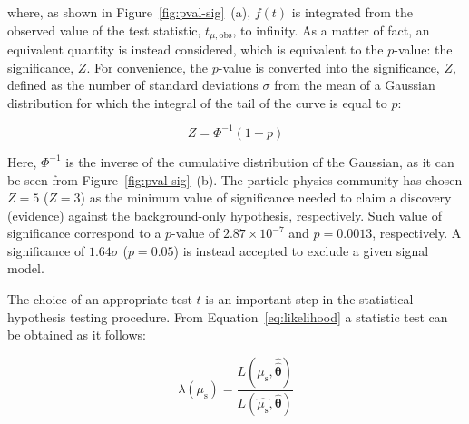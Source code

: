 			\noindent where, as shown in Figure~\ref{fig:pval-sig}~(a), $f(t)$ is integrated from the observed value of the test statistic, $t_{\mu,\mathrm{obs}}$, to infinity. As a matter of fact, an equivalent quantity is instead considered, which is equivalent to the $p$-value: the significance, $Z$. For convenience, the $p$-value is converted into the significance, $Z$, defined as the number of standard deviations $\sigma$ from the mean of a Gaussian distribution for which the integral of the tail of the curve is equal to $p$: 

			\begin{equation}
				Z = \Phi^{-1} \left ( 1 - p \right )
			\label{eq:Z_pval}
			\end{equation}

			\noindent Here, $\Phi^{-1}$ is the inverse of the cumulative distribution of the Gaussian, as it can be seen from Figure~\ref{fig:pval-sig}~(b). The particle physics community has chosen $Z = 5$ ($Z=3$) as the minimum value of significance needed to claim a discovery (evidence) against the background-only hypothesis, respectively. Such value of significance correspond to a $p$-value of $2.87 \times 10^{-7}$ and $p = 0.0013$, respectively. A significance of $1.64\sigma$ ($p = 0.05$) is instead accepted to exclude a given signal model.

			The choice of an appropriate test $t$ is an important step in the statistical hypothesis testing procedure. From Equation~\ref{eq:likelihood} a statistic test can be obtained as it follows: 

			\begin{equation}
				\lambda \left ( \mu_{\mathrm{s}} \right ) = \frac{L\left ( \mu_{\mathrm{s}}, \hat{\hat{\bm{\theta}}} \right )}{L\left ( \hat{\mu_{\mathrm{s}}}, \hat{\bm{\theta}} \right )}
			\label{eq:PLR}
			\end{equation}


